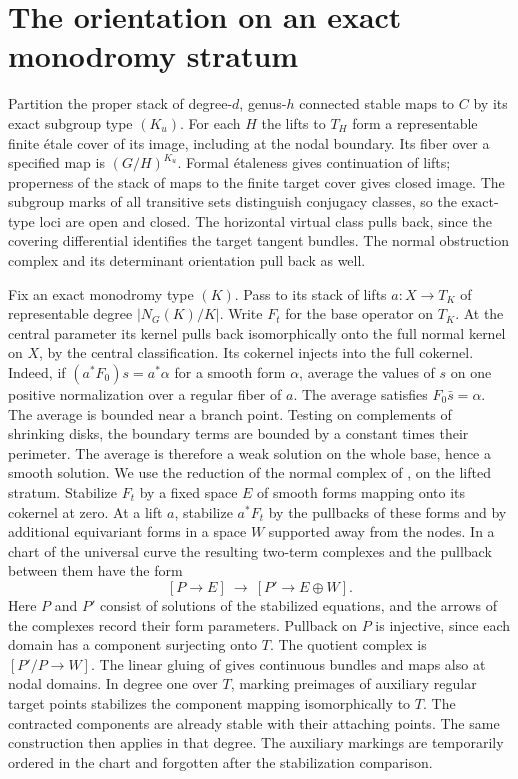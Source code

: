 \section{The orientation on an exact monodromy stratum}\label{sec:oriented}
Partition the proper stack of degree-\(d\), genus-\(h\) connected stable maps to \(C\) by its exact subgroup type \((K_u)\). For each \(H\) the lifts to \(T_H\) form a representable finite étale cover of its image, including at the nodal boundary. Its fiber over a specified map is \((G/H)^{K_u}\). Formal étaleness gives continuation of lifts; properness of the stack of maps to the finite target cover gives closed image. The subgroup marks of all transitive sets distinguish conjugacy classes, so the exact-type loci are open and closed. The horizontal virtual class pulls back, since the covering differential identifies the target tangent bundles. The normal obstruction complex and its determinant orientation pull back as well.

Fix an exact monodromy type \((K)\). Pass to its stack of lifts
\(a:X\to T_K\) of representable degree \(|N_G(K)/K|\). Write \(F_t\) for
the base operator on \(T_K\). At the central parameter its kernel pulls
back isomorphically onto the full normal kernel on \(X\), by the central
classification. Its cokernel injects into the full cokernel. Indeed, if
\((a^*F_0)s=a^*\alpha\) for a smooth form \(\alpha\), average the values of
\(s\) on one positive normalization over a regular fiber of \(a\). The
average satisfies \(F_0\bar s=\alpha\). The average is bounded near a
branch point. Testing on complements of shrinking disks, the boundary
terms are bounded by a constant times their perimeter. The average is
therefore a weak solution on the whole base, hence a smooth solution.
We use the reduction of the normal complex of
\cite[Appendix~B]{bai}, on the lifted stratum. Stabilize $F_t$ by a fixed
space $E$ of smooth forms mapping onto its cokernel at zero. At a lift
$a$, stabilize $a^*F_t$ by the pullbacks of these forms and by
additional equivariant forms in a space $W$ supported away from the
nodes. In a chart of the universal curve the resulting two-term
complexes and the pullback between them have the form
\[
           [P\longrightarrow E]\ \longrightarrow\
                      [P'\longrightarrow E\oplus W].
\]
Here $P$ and $P'$ consist of solutions of the stabilized equations, and
the arrows of the complexes record their form parameters. Pullback on
$P$ is injective, since each domain has a component surjecting onto
$T$. The quotient complex is $[P'/P\to W]$. The linear gluing of
\cite[(B.5)--(B.10)]{bai} gives continuous bundles and maps also at
nodal domains. In degree one over $T$, marking preimages of auxiliary regular target
points stabilizes the component mapping isomorphically to $T$. The
contracted components are already stable with their attaching points. The same construction
then applies in that degree. The auxiliary markings are temporarily ordered in the chart and forgotten after the stabilization comparison.

